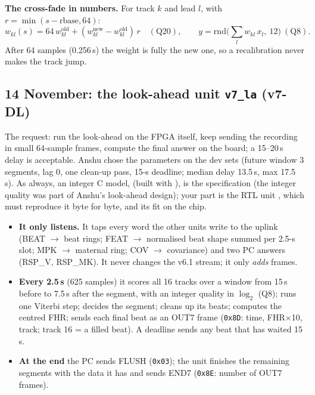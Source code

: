 \documentclass[11pt]{article}
\newcommand{\mods}[1]{\texttt{\detokenize{#1}}}   %
\newcommand{\hex}[1]{\texttt{0x#1}}
\begin{document}
\textbf{The cross-fade in numbers.} For track $k$ and lead $l$, with $r = \min(s - \text{rbase}, 64)$:
\[
w_{kl}(s) = 64\,w^{\text{old}}_{kl} + (w^{\text{new}}_{kl} - w^{\text{old}}_{kl})\, r \quad (\text{Q20}),\qquad y = \text{rnd}\big(\textstyle\sum_l w_{kl}\,x_l,\ 12\big)\ (\text{Q8}).
\]
After 64 samples (0.256\,s) the weight is fully the new one, so a recalibration never makes the track jump.

\subsection{14 November: the look-ahead unit \texorpdfstring{\texttt{v7\_la}}{v7\_la} (v7-DL)}
The request: run the look-ahead on the FPGA itself, keep sending the recording in small 64-sample frames, compute the final answer on the board; a 15--20\,s delay is acceptable. Anshu chose the parameters on the dev sets (future window 3 segments, lag 0, one clean-up pass, 15-s deadline; median delay 13.5\,s, max 17.5\,s). As always, an integer C model,  (built with \mods{-DV7}), is the specification (the integer quality was part of Anshu's look-ahead design); your part is the RTL unit , which must reproduce it byte for byte, and its fit on the chip.

\begin{simple}[What \mods{v7_la} does]
\begin{itemize}
  \item \textbf{It only listens.} It taps every word the other units write to the uplink (BEAT $\to$ beat rings; FEAT $\to$ normalised beat shape summed per 2.5-s slot; MPK $\to$ maternal ring; COV $\to$ covariance) and two PC answers (RSP\_V, RSP\_MK). It never changes the v6.1 stream; it only \emph{adds} frames.
  \item \textbf{Every 2.5\,s} (625 samples) it scores all 16 tracks over a window from 15\,s before to 7.5\,s after the segment, with an integer quality in $\log_2$ (Q8); runs one Viterbi step; decides the segment; cleans up its beats; computes the centred FHR; sends each final beat as an OUT7 frame (\hex{8D}: time, FHR$\times$10, track; track 16 = a filled beat). A deadline sends any beat that has waited 15\,s.
  \item \textbf{At the end} the PC sends FLUSH (\hex{03}); the unit finishes the remaining segments with the data it has and sends END7 (\hex{8E}: number of OUT7 frames).
\end{itemize}
\end{simple}
\end{document}
